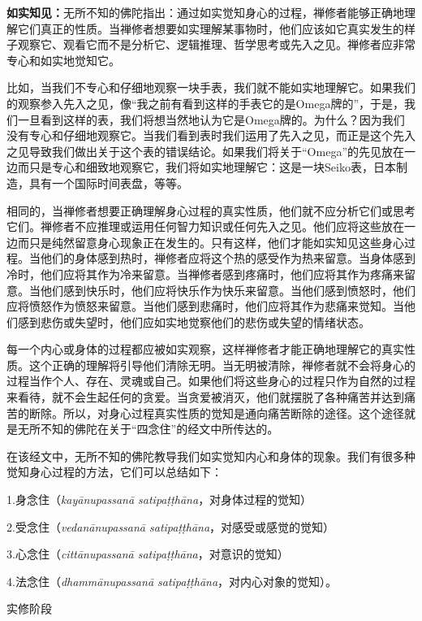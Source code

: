 {\bf 如实知见：}无所不知的佛陀指出：通过如实觉知身心的过程，禅修者能够正确地理解它们真正的性质。当禅修者想要如实理解某事物时，他们应该如它真实发生的样子观察它、观看它而不是分析它、逻辑推理、哲学思考或先入之见。禅修者应非常专心和如实地觉知它。

比如，当我们不专心和仔细地观察一块手表，我们就不能如实地理解它。如果我们的观察参入先入\1之见，像“我之前有看到这样的手表它的是Omega牌的”，于是，我们一旦看到这样的表，我们将想当然地认为它是Omega牌的。为什么？因为我们没有专心和仔细地观察它。当我们看到表时我们运用了先入之见，而正是这个先入之见导致我们做出关于这个表的错误结论。如果我们将关于“Omega”的先见放在一边而只是专心和细致地观察它，我们将如实地理解它：这是一块Seiko表，日本制造，具有一个国际时间表盘，等等。

相同的，当禅修者想要正确理解身心过程的真实性质，他们就不应分析它们或思考它们。禅修者不应推理或运用任何智力知识或任何先入之见。他们应将这些放在一边而只是纯然留意身心现象正在发生的。只有这样，他们才能如实知见这些身心过程。当他们的身体感到热时，禅修者应将这个热的感受作为热来留意。当身体感到冷时，他们应将其作为冷来留意。当禅修者感到疼痛时，他们应将其作为疼痛来留意。当他们感到快乐时，他们应将快乐作为快乐来留意。当他们感到愤怒时，他们应将愤怒作为愤怒来留意。当他们感到悲痛时，他们应将其作为悲痛来觉知。当他们感到悲伤或失望时，他们应如实地觉察他们的悲伤或失望的情绪状态。

每一个内心或身体的过程都应被如实观察，这样禅修者才能正确地理解它的真实性质。这个正确的理解将引导他们清除无明。当无明被清除，禅修者就不会将身心的过程当作个人、存在、灵魂或自己。如果\1他们将这些身心的过程只作为自然的过程来看待，就不会生起任何的贪爱。当贪爱被消灭，他们就摆脱了各种痛苦并达到痛苦的断除。所以，对身心过程真实性质的觉知是通向痛苦断除的途径。这个途径就是无所不知的佛陀在关于“四念住”的经文中所传达的。

在该经文中，无所不知的佛陀教导我们如实觉知内心和身体的现象。我们有很多种觉知身心过程的方法，它们可以总结如下：

{
\leftskip=1.6pc
\item{1.}身念住（{\it kay\=anupassan\=a satipa\d t\d th\=ana}，对身体过程的觉知）
\item{2.}受念住（{\it vedan\=anupassan\=a satipa\d t\d th\=ana}，对感受或感觉的觉知）
\item{3.}心念住（{\it citt\=anupassan\=a satipa\d t\d th\=ana}，对意识的觉知）
\item{4.}法念住（{\it dhamm\=anupassan\=a satipa\d t\d th\=ana}，对内心对象的觉知）。

}

\sssubsectnoni 实修阶段

